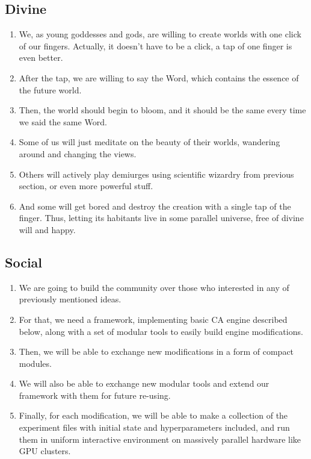 \documentclass[a4paper,12pt,tikz,UTF8]{article}
\begin{document}
  \subsection{Divine}

  \begin{enumerate}
    \item We, as young goddesses and gods, are willing to create worlds with one click of our fingers. Actually, it doesn't have to be a click, a tap of one finger is even better.
    \item After the tap, we are willing to say the Word, which contains the essence of the future world.
    \item Then, the world should begin to bloom, and it should be the same every time we said the same Word.
    \item Some of us will just meditate on the beauty of their worlds, wandering around and changing the views.
    \item Others will actively play demiurges using scientific wizardry from previous section, or even more powerful stuff.
    \item And some will get bored and destroy the creation with a single tap of the finger. Thus, letting its habitants live in some parallel universe, free of divine will and happy.
  \end{enumerate}

  \subsection{Social}

  \begin{enumerate}
    \item We are going to build the community over those who interested in any of previously mentioned ideas.
    \item For that, we need a framework, implementing basic CA engine described below, along with a set of modular tools to easily build engine modifications.
    \item Then, we will be able to exchange new modifications in a form of compact modules.
    \item We will also be able to exchange new modular tools and extend our framework with them for future re-using.
    \item Finally, for each modification, we will be able to make a collection of the experiment files with initial state and hyperparameters included, and run them in uniform interactive environment on massively parallel hardware like GPU clusters.
  \end{enumerate}
\end{document}

